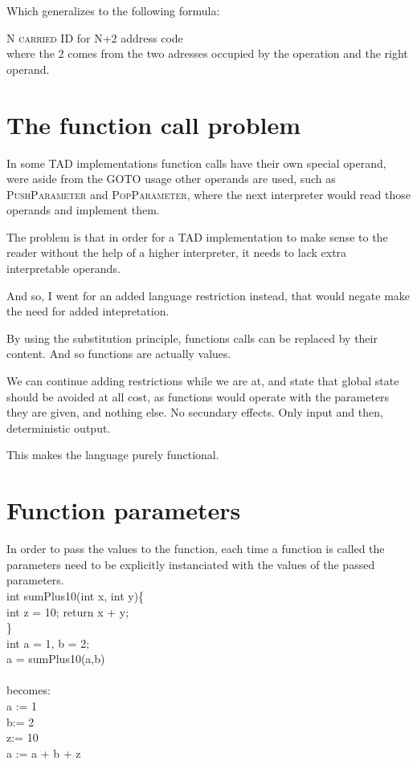 \documentclass[twocolumn,10ptr]{article}
\begin{document}
	Which generalizes to the following formula:
	
	\textsc{ N carried ID } for { N+2 address code }\\
	where the 2 comes from the two adresses occupied by the operation and the  right operand.
	
	
	
	
	
	
	
	\section{The function call problem}
	
	In some TAD implementations function calls have their own special operand, were aside from the \textsc{GOTO} usage
	other operands are used, such as\textsc{ PushParameter} and\textsc{ PopParameter}, where the next interpreter would
	read those operands and implement them.
	
	The problem is that in order for a TAD implementation to make sense to the reader without the help of a higher
	interpreter, it needs to lack extra interpretable operands.
	
	And so, I went for an added language restriction instead, that would negate make the need for added intepretation.
	
	By using the substitution principle, functions calls can be replaced by their content. And so functions are actually values.
	
	We can continue adding restrictions while we are at, and state that global state should be avoided at all cost, as functions
	would operate with the parameters they are given, and nothing else. No secundary effects.
	 Only input and then, deterministic output.
	
	This makes the language purely functional.
	
	
	\section{Function parameters}
	
	In order to pass the values to the function, each time a function is called the parameters need to be 
	explicitly instanciated with the values of the passed parameters.
	\\
	int sumPlus10(int x, int y)\{ \\
	
	int z = 10;
	return x + y;\\
	\}\\
	int a = 1, b = 2; \\
	a = sumPlus10(a,b)\\
	\\
	becomes: \\
	a := 1 \\
	b:= 2 \\
	z:= 10 \\
	a := a + b + z\\
	
\end{document}
